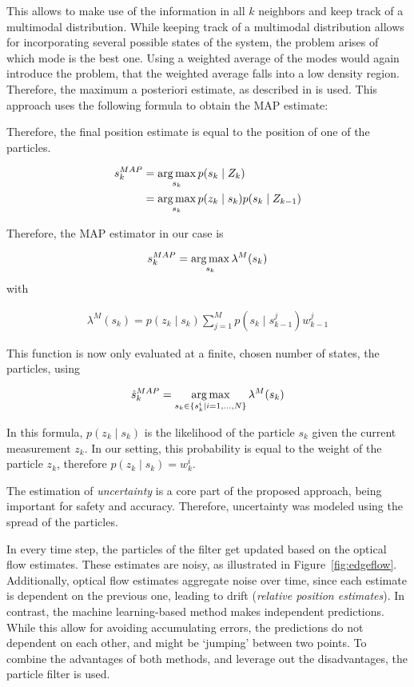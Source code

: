 This allows to make use of the information in all $k$ neighbors and
keep track of a multimodal distribution. While keeping track of a
multimodal distribution allows for incorporating several possible
states of the system, the problem arises of which mode is the best
one. Using a weighted average of the modes would again introduce the
problem, that the weighted average falls into a low density
region. Therefore, the maximum a posteriori estimate, as described in
\cite{driessen2008map} is used. This approach uses the following
formula to obtain the MAP estimate:

Therefore, the final position estimate is equal to the position of one
of the particles.

\begin{align}
  s_k^{MAP}  &= \operatorname*{arg\,max}_{s_k}{p(s_k \mid Z_k)}\\
             &= \operatorname*{arg\,max}_{s_k}{p(z_k \mid s_k) p(s_k \mid Z_{k-1})} 
\end{align}

Therefore, the MAP estimator in our case is

\begin{align}
s_k^{MAP} = \operatorname*{arg\,max}_{s_k} \lambda^M(s_k)
\end{align}
with

\begin{align}
\lambda^M(s_k) = p(z_k \mid s_k) \sum_{j=1}^Mp(s_k \mid s_{k-1}^j)w^j_{k-1}
\end{align}

This function is now only evaluated at a finite, chosen number of
states, the particles, using

\begin{align}
\hat{s}_k^{MAP} = \operatorname*{arg\,max}_{s_k \in \{s_k^i \mid i=1,\ldots,N\}} \lambda^M(s_k)
\end{align}

In this formula, $p(z_k \mid s_k)$ is the likelihood of the particle
$s_k$ given the current measurement $z_k$. In our setting, this
probability is equal to the weight of the particle $z_k$, therefore
$p(z_k \mid s_k) = w^i_k$.

The estimation of \emph{uncertainty} is a core part of the proposed
approach, being important for safety and accuracy. Therefore,
uncertainty was modeled using the spread of the particles.

In every time step, the particles of the filter get updated based on
the optical flow estimates. These estimates are noisy, as illustrated
in Figure~\ref{fig:edgeflow}. Additionally, optical flow estimates
aggregate noise over time, since each estimate is dependent on the
previous one, leading to drift (\emph{relative position
  estimates}). In contrast, the machine learning-based method makes
independent predictions. While this allow for avoiding accumulating
errors, the predictions do not dependent on each other, and might be
`jumping' between two points. To combine the advantages of both
methods, and leverage out the disadvantages, the particle filter is
used.

